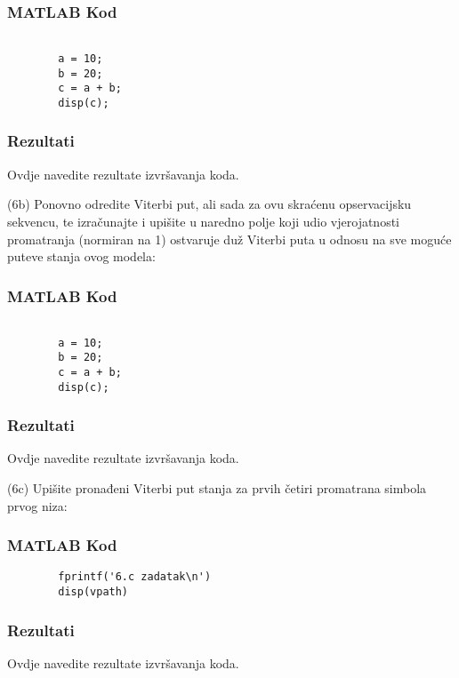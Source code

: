 \documentclass[12pt]{article}
\begin{document}
	\subsubsection*{MATLAB Kod}
	\begin{lstlisting}
		
		a = 10;
		b = 20;
		c = a + b;
		disp(c);
	\end{lstlisting}
	
	\subsubsection*{Rezultati}
	Ovdje navedite rezultate izvršavanja koda.\newline
	
	(6b) Ponovno odredite Viterbi put, ali sada za ovu skraćenu opservacijsku sekvencu, te izračunajte i upišite u naredno polje koji udio vjerojatnosti promatranja (normiran na 1) ostvaruje duž Viterbi puta u odnosu na sve moguće puteve stanja ovog modela:
	
	\subsubsection*{MATLAB Kod}
	\begin{lstlisting}
		
		a = 10;
		b = 20;
		c = a + b;
		disp(c);
	\end{lstlisting}
	
	\subsubsection*{Rezultati}
	Ovdje navedite rezultate izvršavanja koda.\newline
	
	(6c) Upišite pronađeni Viterbi put stanja za prvih četiri promatrana simbola prvog niza:
	\subsubsection*{MATLAB Kod}
	\begin{lstlisting}
		fprintf('6.c zadatak\n')
		disp(vpath)
	\end{lstlisting}
	
	\subsubsection*{Rezultati}
	Ovdje navedite rezultate izvršavanja koda.\newline
	
\end{document}
